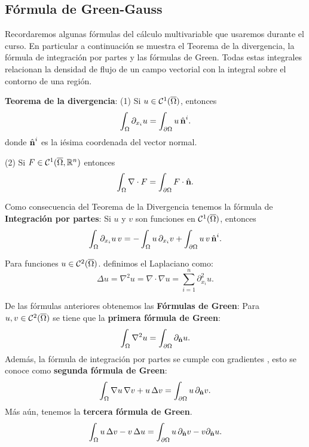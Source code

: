 \documentclass[../edp.tex]{subfiles}
\begin{document}
\subsection{Fórmula de Green-Gauss}

Recordaremos algunas fórmulas del cálculo multivariable que usaremos durante el
curso. En particular a continuación se muestra el Teorema de la divergencia,
la fórmula de integración por partes y las fórmulas de Green. Todas estas
integrales relacionan la densidad de flujo de un campo vectorial con la integral
sobre el contorno de una región.

\noindent \textbf{Teorema de la divergencia}:
\label{teo:divergencia}
(1) Si \(u \in \mathcal{C}^{1}(\overline\Omega)\), entonces 
\begin{displaymath}
	\int_{\Omega} \partial_{x_i} u 
	=
	\int_{\partial\Omega} u \, \hat{\textbf{n}}^{i}.
\end{displaymath}
donde \(\hat{\textbf{n}}^{i}\) es la iésima coordenada del vector normal.

(2) Si \(F \in \mathcal{C}^{1}(\overline\Omega, \mathbb{R}^n)\) entonces
\begin{displaymath}
	\int_{\Omega} \nabla \cdot F
	=
	\int_{\partial\Omega} F\cdot \hat{\textbf{n}}.
\end{displaymath}

Como consecuencia del Teorema de la Divergencia tenemos la fórmula de 
\textbf{Integración por partes}:
Si \(u\) y \(v\) son funciones en \(\mathcal{C}^{1}(\overline\Omega)\), entonces
\begin{displaymath}
	\int_{\Omega} \partial_{x_i} u \, v
	=
	-\int_{\Omega} u \, \partial_{x_i} v
	+
	\int_{\partial \Omega} u\, v\, \hat{\textbf{n}}^{i}.
\end{displaymath}

Para funciones \(u \in \mathcal{C}^{2}(\overline\Omega)\).
definimos el Laplaciano como:
\begin{displaymath}
	\Delta u
	=
	\nabla^2 u
	=
	\nabla\cdot \nabla u
	=
	\sum_{i=1}^{n} \partial^2_{x_i} u.
\end{displaymath}

De las fórmulas anteriores obtenemos las \textbf{Fórmulas de Green}:
Para \(u, v\in \mathcal{C}^{2}(\overline\Omega)\) se tiene que
la \textbf{primera fórmula de Green}:
\begin{displaymath}
	\int_{\Omega} \nabla^2 u
	=
	\int_{\partial\Omega} \partial_{\hat{\textbf{n}}} u.
\end{displaymath}
Además, la fórmula de integración por partes se cumple con gradientes 
, esto se conoce como \textbf{segunda fórmula de Green}:
\begin{displaymath}
	\int_{\Omega} \nabla u\, \nabla v + u\, \Delta v
	=
	\int_{\partial \Omega} u\, \partial_{\hat{\textbf{n}}} v.
\end{displaymath}
Más aún, tenemos la \textbf{tercera fórmula de Green}.
\begin{displaymath}
	\int_{\Omega} u\, \Delta v - v\, \Delta u
	=
	\int_{\partial\Omega} u\, \partial_{\hat{\textbf{n}}} v - v \partial_{\hat{\textbf{n}}} u.
\end{displaymath}
\end{document}
